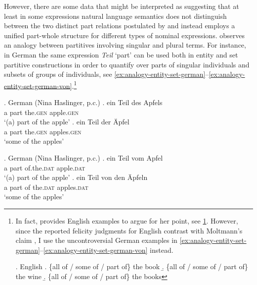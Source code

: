 However, there are some data that might be interpreted as suggesting that at least in some expressions natural language semantics does not distinguish between the two distinct part relations postulated by \citet{link1983logical} and instead employs a unified part-whole structure for different types of nominal expressions. \citet{moltmann1997parts,moltmann1998part} observes an analogy between partitives involving singular and plural terms. For instance, in German the same expression \textit{Teil} `part' can be used both in entity and set partitive constructions in order to quantify over parts of singular individuals and subsets of groups of individuals, see \ref{ex:analogy-entity-set-german}--\ref{ex:analogy-entity-set-german-von}.\footnote{In fact, \citet{moltmann1997parts,moltmann1998part} provides English examples to argue for her point, see \ref{ex:moltmann-unreliable}. However, since the reported felicity judgments for English contrast with Moltmann's claim \citep[see][]{schwarzschild1996pluralities}, I use the uncontroversial German examples in \ref{ex:analogy-entity-set-german}--\ref{ex:analogy-entity-set-german-von} instead.

\ex.\label{ex:moltmann-unreliable} English \citep[p. 11]{moltmann1997parts}
\a. \{all of / some of / part of\} the book
\b. \{all of / some of / part of\} the wine
\b. \{all of / some of / part of\} the books

} 

			\ex.\label{ex:analogy-entity-set-german} German (Nina Haslinger, p.c.)
            \ag. ein Teil des Apfels\label{ex:analogy-entity-german}\\
			a part the\textsc{.gen} apple\textsc{.gen}\\
			`(a) part of the apple'
			\bg. ein Teil der Äpfel\label{ex:analogy-set-german}\\
			a part the\textsc{.gen} apples\textsc{.gen}\\
			`some of the apples'
			
			\ex.\label{ex:analogy-entity-set-german-von} German (Nina Haslinger, p.c.)
            \ag. ein Teil vom Apfel\label{ex:analogy-entity-german-von}\\
			a part of.the\textsc{.dat} apple\textsc{.dat}\\
			`(a) part of the apple'
			\bg. ein Teil von den Äpfeln\label{ex:analogy-set-german-von}\\
			a part of the\textsc{.dat} apples\textsc{.dat}\\
			`some of the apples'

